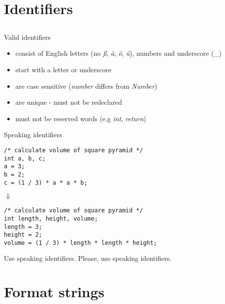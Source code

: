 \section{Identifiers}
\subsection{}
\begin{frame}{Valid identifiers}
	\begin{itemize}
		\item consist of English letters (no \textit{ß}, \textit{ä}, \textit{ö}, \textit{ü}), numbers and underscore (\_)
		\item start with a letter or underscore
		\item are case sensitive (\textit{number} differs from \textit{Number})
		\item are unique - must not be redeclared
		\item must not be reserved words (e.g \textit{int}, \textit{return})
	\end{itemize}
\end{frame}
\begin{frame}[fragile]{Speaking identifiers}
	\begin{lstlisting}
/* calculate volume of square pyramid */
int a, b, c;
a = 3;
b = 2;
c = (1 / 3) * a * a * b;
\end{lstlisting}
\centering
$\Downarrow$
	\begin{lstlisting}
/* calculate volume of square pyramid */
int length, height, volume;
length = 3;
height = 2;
volume = (1 / 3) * length * length * height;
\end{lstlisting}
\end{frame}
\begin{frame}{Use speaking identifiers.}
	\LARGE
	\centering
	Please, use speaking identifiers.\footnotemark
	
\end{frame}
\section{Format strings}
